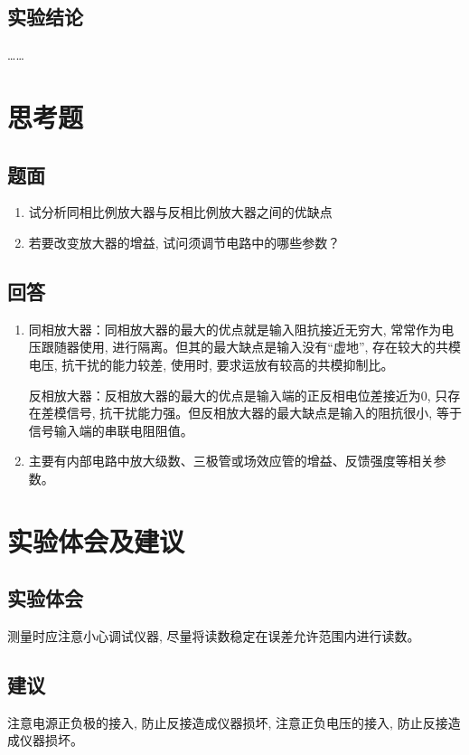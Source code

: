 \documentclass[10pt, a4paper]{article} %
\begin{document}
\newpage

\subsection{实验结论}
……
\section{思考题}
\subsection{题面}
\begin{enumerate}[leftmargin=50pt,label=(\arabic*)] %
    \item 试分析同相比例放大器与反相比例放大器之间的优缺点
    \item 若要改变放大器的增益, 试问须调节电路中的哪些参数？


\end{enumerate}
\subsection{回答}

\begin{enumerate}[leftmargin=50pt,label=(\arabic*)] %
    \item 同相放大器：同相放大器的最大的优点就是输入阻抗接近无穷大, 常常作为电压跟随器使用, 进行隔离。但其的最大缺点是输入没有“虚地”, 存在较大的共模电压, 抗干扰的能力较差, 使用时, 要求运放有较高的共模抑制比。
    
    反相放大器：反相放大器的最大的优点是输入端的正反相电位差接近为0, 只存在差模信号, 抗干扰能力强。但反相放大器的最大缺点是输入的阻抗很小, 等于信号输入端的串联电阻阻值。
    \item 主要有内部电路中放大级数、三极管或场效应管的增益、反馈强度等相关参数。
\end{enumerate}

\section{实验体会及建议}
\subsection{实验体会}
测量时应注意小心调试仪器, 尽量将读数稳定在误差允许范围内进行读数。
\subsection{建议}
注意电源正负极的接入, 防止反接造成仪器损坏, 注意正负电压的接入, 防止反接造成仪器损坏。
\end{document}
